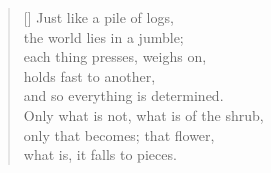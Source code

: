 \documentclass[a4paper,12pt,twoside,final]{book}
\begin{document}

\newpage


\settowidth{\versewidth}{each thing constricts, presses against,}

\begin{verse}[\versewidth]
  Just like a pile of logs, \\
  the world lies in a jumble; \\
  each thing presses, weighs on, \\
  holds fast to another, \\
  and so everything is determined. \\
  Only what is not, what is of the shrub, \\
  only that becomes; that flower, \\
  what is, it falls to pieces.
\end{verse}

\newpage

\settowidth{\versewidth}{Csak ami nincs, annak van bokra,}
\end{document}
